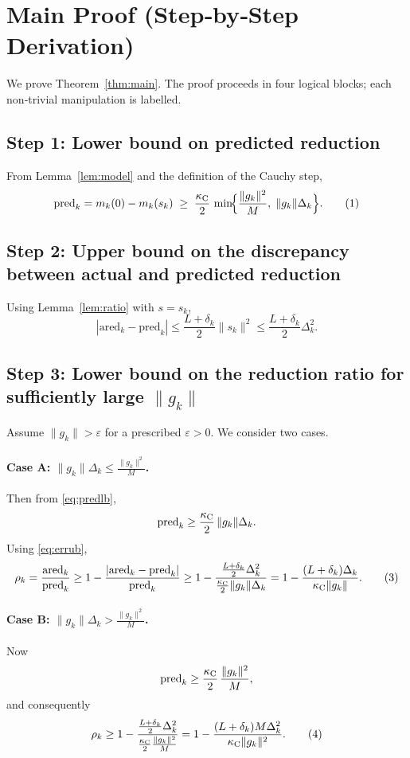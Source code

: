 \documentclass{article}
\begin{document}
\section*{Main Proof (Step‑by‑Step Derivation)}
We prove Theorem~\ref{thm:main}.  The proof proceeds in four logical blocks; each non‑trivial manipulation is labelled.

\subsection*{Step 1: Lower bound on predicted reduction}
From Lemma~\ref{lem:model} and the definition of the Cauchy step,
\[
\text{pred}_{k}=m_{k}(0)-m_{k}(s_{k})
\;\ge\;
\frac{\kappa_{\rm C}}{2}\,\min\!\Bigl\{\frac{\|g_{k}\|^{2}}{M},\;\|g_{k}\|\Delta_{k}\Bigr\}.
\tag{1}\label{eq:predlb}
\]

\subsection*{Step 2: Upper bound on the discrepancy between actual and predicted reduction}
Using Lemma~\ref{lem:ratio} with $s=s_{k}$,
\[
|\text{ared}_{k}-\text{pred}_{k}|
\le\frac{L+\delta_{k}}{2}\|s_{k}\|^{2}
\le\frac{L+\delta_{k}}{2}\Delta_{k}^{2}.
\tag{2}\label{eq:errub}
\]

\subsection*{Step 3: Lower bound on the reduction ratio for sufficiently large $\|g_{k}\|$}
Assume $\|g_{k}\|>\varepsilon$ for a prescribed $\varepsilon>0$.  
We consider two cases.

\paragraph{Case A: $\|g_{k}\|\Delta_{k}\le\frac{\|g_{k}\|^{2}}{M}$.}
Then from \eqref{eq:predlb},
\[
\text{pred}_{k}\ge \frac{\kappa_{\rm C}}{2}\,\|g_{k}\|\Delta_{k}.
\]
Using \eqref{eq:errub},
\[
\rho_{k}
=\frac{\text{ared}_{k}}{\text{pred}_{k}}
\ge
1-\frac{|\text{ared}_{k}-\text{pred}_{k}|}{\text{pred}_{k}}
\ge
1-\frac{\frac{L+\delta_{k}}{2}\Delta_{k}^{2}}{\frac{\kappa_{\rm C}}{2}\|g_{k}\|\Delta_{k}}
=
1-\frac{(L+\delta_{k})\Delta_{k}}{\kappa_{\rm C}\|g_{k}\|}.
\tag{3}\label{eq:rhoA}
\]

\paragraph{Case B: $\|g_{k}\|\Delta_{k}>\frac{\|g_{k}\|^{2}}{M}$.}
Now
\[
\text{pred}_{k}\ge \frac{\kappa_{\rm C}}{2}\,\frac{\|g_{k}\|^{2}}{M},
\]
and consequently
\[
\rho_{k}
\ge
1-\frac{\frac{L+\delta_{k}}{2}\Delta_{k}^{2}}{\frac{\kappa_{\rm C}}{2}\frac{\|g_{k}\|^{2}}{M}}
=
1-\frac{(L+\delta_{k})M\Delta_{k}^{2}}{\kappa_{\rm C}\|g_{k}\|^{2}}.
\tag{4}\label{eq:rhoB}
\]
\end{document}
